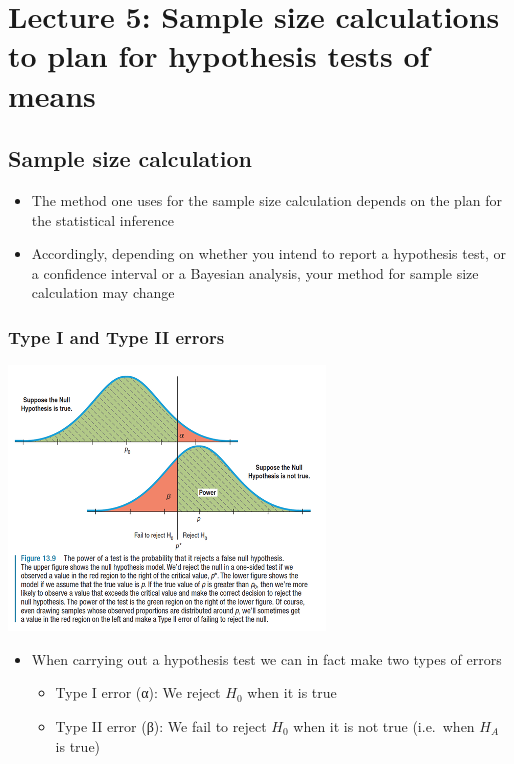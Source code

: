 \documentclass[
]{book}
\providecommand{\tightlist}{%
  \setlength{\itemsep}{0pt}\setlength{\parskip}{0pt}}
\begin{document}
\hypertarget{lecture-5-sample-size-calculations-to-plan-for-hypothesis-tests-of-means}{%
\chapter{Lecture 5: Sample size calculations to plan for hypothesis tests of means}\label{lecture-5-sample-size-calculations-to-plan-for-hypothesis-tests-of-means}}

\hypertarget{sample-size-calculation-1}{%
\section{Sample size calculation}\label{sample-size-calculation-1}}

\begin{itemize}
\tightlist
\item
  The method one uses for the sample size calculation depends on the plan for the statistical inference
\item
  Accordingly, depending on whether you intend to report a hypothesis test, or a confidence interval or a Bayesian analysis, your method for sample size calculation may change
\end{itemize}

\hypertarget{type-i-and-type-ii-errors-2}{%
\subsection{Type I and Type II errors}\label{type-i-and-type-ii-errors-2}}

\includegraphics[width=0.5\linewidth]{./5_3}

\begin{itemize}
\tightlist
\item
  When carrying out a hypothesis test we can in fact make two types of errors

  \begin{itemize}
  \tightlist
  \item
    Type I error (α): We reject \(H_0\) when it is true
  \item
    Type II error (β): We fail to reject \(H_0\) when it is not true (i.e.~when \(H_A\) is true)
  \end{itemize}
\end{itemize}
\end{document}
